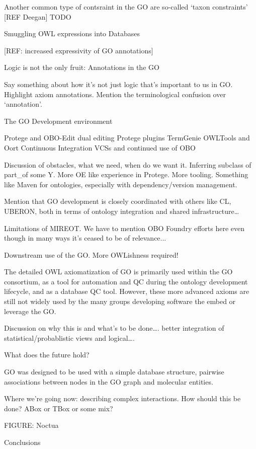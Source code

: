 \documentclass{llncs}
\begin{document}
Another common type of contsraint in the GO are so-called ‘taxon constraints’ [REF Deegan]
TODO

Smuggling OWL expressions into Databases

[REF: increased expressivity of GO annotations]

Logic is not the only fruit: Annotations in the GO

Say something about how it’s not just logic that’s important to us in GO. Highlight axiom annotations.
Mention the terminological confusion over ‘annotation’.

The GO Development environment

Protege and OBO-Edit dual editing
Protege plugins
TermGenie
OWLTools and Oort
Continuous Integration
VCSs and continued use of OBO

Discussion of obstacles, what we need, when do we want it. Inferring subclass of part\_of some Y. More OE like experience in Protege. More tooling. Something like Maven for ontologies, especially with dependency/version management.

Mention that GO development is closely coordinated with others like CL, UBERON, both in terms of ontology integration and shared infrastructure…

Limitations of MIREOT. We have to mention OBO Foundry efforts here even though in many ways it’s ceased to be of relevance...

Downstream use of the GO. More OWLishness required!

The detailed OWL axiomatization of GO is primarily used within the GO consortium, as a tool for automation and QC during the ontology development lifecycle, and as a database QC tool. However, these more advanced axioms are still not widely used by the many groups developing software the embed or leverage the GO.

Discussion on why this is and what’s to be done…. better integration of statistical/probablistic views and logical….



What does the future hold?

GO was designed to be used with a simple database structure, pairwise associations between nodes in the GO graph and molecular entities. 

Where we’re going now: describing complex interactions. How should this be done? ABox or TBox or some mix? 

FIGURE: Noctua

Conclusions
\end{document}
